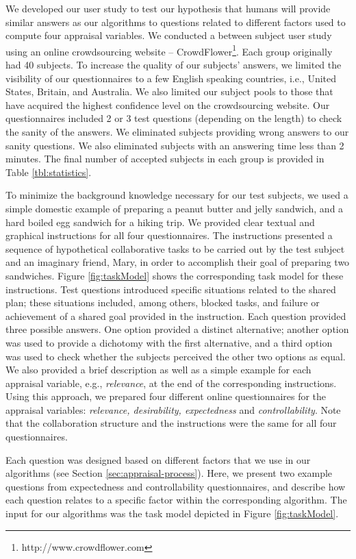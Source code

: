 \documentclass{aamas2016}
\begin{document}
We developed our user study to test our hypothesis that humans will provide
similar answers as our algorithms to questions related to different factors used
to compute four appraisal variables. We conducted a between subject user study
using an online crowdsourcing website --
CrowdFlower\footnote{http://www.crowdflower.com}. Each group originally had 40
subjects. To increase the quality of our subjects' answers, we limited the
visibility of our questionnaires to a few English speaking countries, i.e.,
United States, Britain, and Australia. We also limited our subject pools to
those that have acquired the highest confidence level on the crowdsourcing
website. Our questionnaires included 2 or 3 test questions (depending on the
length) to check the sanity of the answers. We eliminated subjects providing
wrong answers to our sanity questions. We also eliminated subjects with an
answering time less than 2 minutes. The final number of accepted subjects in
each group is provided in Table \ref{tbl:statistics}.

To minimize the background knowledge necessary for our test subjects, we used a
simple domestic example of preparing a peanut butter and jelly sandwich, and a
hard boiled egg sandwich for a hiking trip. We provided clear textual and
graphical instructions for all four questionnaires. The instructions presented
a sequence of hypothetical collaborative tasks to be carried out by the test
subject and an imaginary friend, Mary, in order to accomplish their goal of
preparing two sandwiches. Figure \ref{fig:taskModel} shows the corresponding
task model for these instructions. Test questions introduced specific situations
related to the shared plan; these situations included, among others, blocked
tasks, and failure or achievement of a shared goal provided in the instruction.
Each question provided three possible answers. One option provided a distinct
alternative; another option was used to provide a dichotomy with the first
alternative, and a third option was used to check whether the subjects perceived
the other two options as equal. We also provided a brief description as well as
a simple example for each appraisal variable, e.g., \textit{relevance}, at the
end of the corresponding instructions. Using this approach, we prepared four
different online questionnaires for the appraisal variables: \textit{relevance,
desirability, expectedness} and \textit{controllability}. Note that the
collaboration structure and the instructions were the same for all four
questionnaires.

Each question was designed based on different factors that we use in our
algorithms (see Section \ref{sec:appraisal-process}). Here, we present two
example questions from expectedness and controllability questionnaires, and
describe how each question relates to a specific factor within the corresponding
algorithm. The input for our algorithms was the task model depicted in Figure
\ref{fig:taskModel}.
\end{document}
